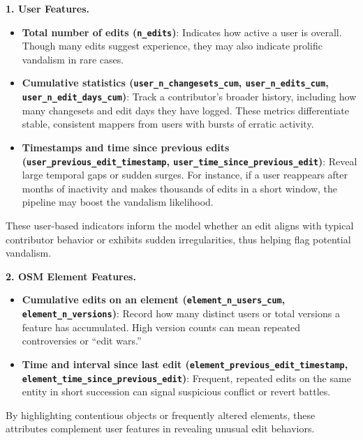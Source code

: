 \documentclass[
    13pt, %
    a4paper, %
    DIV14, %
    listof=totoc, %
    bibliography=totoc, %
    index=totoc, %
    headsepline
]{scrreprt}
\begin{document}
\vspace{1em}
\noindent
\textbf{1. User Features.}
\begin{itemize}
  \item \textbf{Total number of edits (\texttt{n\_edits})}: Indicates how active a user is overall. Though many edits suggest experience, they may also indicate prolific vandalism in rare cases.
  \item \textbf{Cumulative statistics (\texttt{user\_n\_changesets\_cum}, \texttt{user\_n\_edits\_cum}, \newline \texttt{user\_n\_edit\_days\_cum})}: Track a contributor’s broader history, including how many changesets and edit days they have logged. These metrics differentiate stable, consistent mappers from users with bursts of erratic activity.
  \item \textbf{Timestamps and time since previous edits (\texttt{user\_previous\_edit\_timestamp}, \texttt{user\_time\_since\_previous\_edit})}: Reveal large temporal gaps or sudden surges. For instance, if a user reappears after months of inactivity and makes thousands of edits in a short window, the pipeline may boost the vandalism likelihood.
\end{itemize}
These user-based indicators inform the model whether an edit aligns with typical contributor behavior or exhibits sudden irregularities, thus helping flag potential vandalism.

\vspace{1em}
\noindent
\textbf{2. OSM Element Features.}
\begin{itemize}
  \item \textbf{Cumulative edits on an element (\texttt{element\_n\_users\_cum}, \texttt{element\_n\_versions})}: Record how many distinct users or total versions a feature has accumulated. High version counts can mean repeated controversies or “edit wars.”
  \item \textbf{Time and interval since last edit (\texttt{element\_previous\_edit\_timestamp}, \newline \texttt{element\_time\_since\_previous\_edit})}: Frequent, repeated edits on the same entity in short succession can signal suspicious conflict or revert battles.
\end{itemize}
By highlighting contentious objects or frequently altered elements, these attributes complement user features in revealing unusual edit behaviors.
\end{document}
